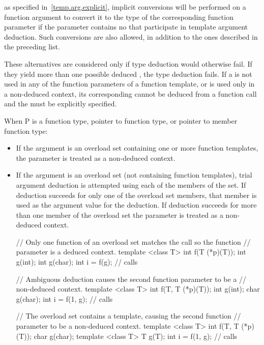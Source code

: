\enternote as specified in~\ref{temp.arg.explicit}, implicit conversions will be
performed on a function argument to convert it to the type of the corresponding
function parameter if the parameter contains no 
that participate in template argument deduction. Such conversions are also
allowed, in addition to the ones described in the preceding list. \exitnote

\pnum
These alternatives are considered only if type deduction would
otherwise fail.
If they yield more than one possible deduced
,
the type deduction fails.
\enternote
If a
is not used in any of the function parameters of a function template,
or is used only in a non-deduced context, its corresponding
cannot be deduced from a function call and the
must be explicitly specified.
\exitnote

\pnum
When P is a function type, pointer to function type, or pointer to member
function type:
\begin{itemize}
\item
If the argument is an overload set containing one or more function templates,
the parameter is treated as a non-deduced context.
\item
If the argument is an overload set (not containing function templates), trial
argument deduction is attempted using each of the members of the set. If
deduction succeeds for only one of the overload set members, that member is
used as the argument value for the deduction. If deduction succeeds for more than
one member of the overload set the parameter is treated as a non-deduced context.

\pnum
\enterexample
\begin{codeblock}
// Only one function of an overload set matches the call so the function
// parameter is a deduced context.
template <class T> int f(T (*p)(T));
int g(int);
int g(char);
int i = f(g);       // calls 
\end{codeblock}
\exitexample

\pnum
\enterexample
\begin{codeblock}
// Ambiguous deduction causes the second function parameter to be a
// non-deduced context.
template <class T> int f(T, T (*p)(T));
int g(int);
char g(char);
int i = f(1, g);    // calls 
\end{codeblock}
\exitexample

\pnum
\enterexample
\begin{codeblock}
// The overload set contains a template, causing the second function
// parameter to be a non-deduced context.
template <class T> int f(T, T (*p)(T));
char g(char);
template <class T> T g(T);
int i = f(1, g);    // calls 
\end{codeblock}
\exitexample
\end{itemize}

